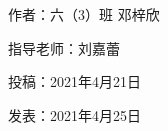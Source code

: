 \vspace{10pt}



作者：六（3）班 邓梓欣



指导老师：刘嘉蕾



投稿：2021年4月21日



发表：2021年4月25日






                



\vspace{10pt}

\hline



